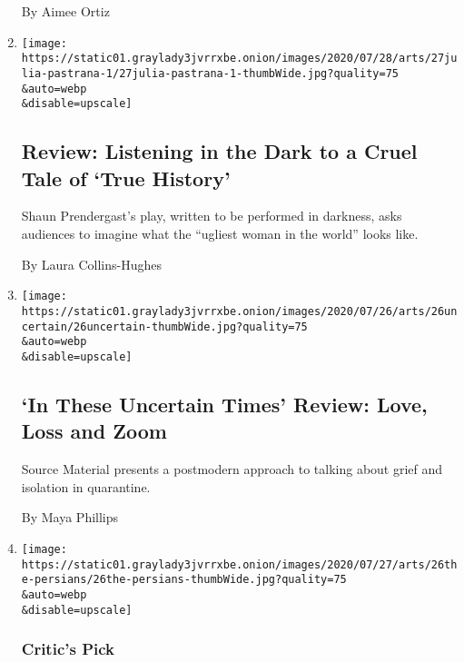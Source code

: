 \begin{enumerate}
  By Aimee Ortiz
\item
  \href{/2020/07/27/theater/true-history-julia-pastrana-review.html}{}

  \texttt{[image: https://static01.graylady3jvrrxbe.onion/images/2020/07/28/arts/27julia-pastrana-1/27julia-pastrana-1-thumbWide.jpg?quality=75\\\&auto=webp\\\&disable=upscale]}

  \hypertarget{review-listening-in-the-dark-to-a-cruel-tale-of-true-history}{%
  \subsection{Review: Listening in the Dark to a Cruel Tale of `True
  History'}\label{review-listening-in-the-dark-to-a-cruel-tale-of-true-history}}

  Shaun Prendergast's play, written to be performed in darkness, asks
  audiences to imagine what the ``ugliest woman in the world'' looks
  like.

  By Laura Collins-Hughes
\item
  \href{/2020/07/26/theater/in-these-uncertain-times-review.html}{}

  \texttt{[image: https://static01.graylady3jvrrxbe.onion/images/2020/07/26/arts/26uncertain/26uncertain-thumbWide.jpg?quality=75\\\&auto=webp\\\&disable=upscale]}

  \hypertarget{in-these-uncertain-times-review-love-loss-and-zoom}{%
  \subsection{`In These Uncertain Times' Review: Love, Loss and
  Zoom}\label{in-these-uncertain-times-review-love-loss-and-zoom}}

  Source Material presents a postmodern approach to talking about grief
  and isolation in quarantine.

  By Maya Phillips
\item
  \href{/2020/07/26/theater/the-persians-review-aeschylus.html}{}

  \texttt{[image: https://static01.graylady3jvrrxbe.onion/images/2020/07/27/arts/26the-persians/26the-persians-thumbWide.jpg?quality=75\\\&auto=webp\\\&disable=upscale]}

  \hypertarget{critics-pick-1}{%
  \subsubsection{Critic's Pick}\label{critics-pick-1}}


\end{enumerate}
